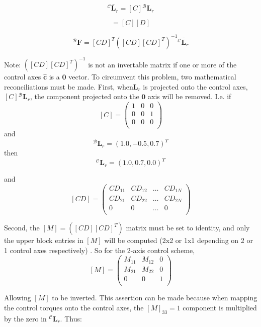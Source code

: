 \begin{equation}
	{}^{\mathcal{C}}\bar{\bm L}_{r} = [C] {}^{\mathcal{B}}\bm L_{r}
\end{equation}

\begin{equation}
	[CD] = [C][D]
\end{equation}

\begin{equation}
	\label{eq:th:min1}
	{}^{\mathcal{B}}\bm F = [CD]^{T}([CD][CD]^{T})^{-1} {}^{\mathcal{C}}\bar{\bm L}_{r}
\end{equation}

Note: $([CD][CD]^{T})^{-1}$ is not an invertable matrix if one or more of the control axes $\hat{\bm c}$ is a $\bm 0$ vector. To circumvent this problem, two mathematical reconciliations must be made. First, when$\bm L_r$ is projected onto the control axes,  $[C] {}^{\mathcal{B}}\bm L_{r}$, the component projected onto the $\bm 0$ axis will be removed. I.e. if 
$$ [C] = \begin{pmatrix}
1 & 0 & 0 \\
0 & 0 & 1 \\
0 & 0 & 0 \\
\end{pmatrix} $$
and 
$$ \bm {}^{\mathcal B} \bm L_r = (1.0, -0.5, 0.7)^T $$
then 
$$ \bm {}^{\mathcal C} \bm L_r = (1.0, 0.7, 0.0)^T $$

and 
 $$ [CD] = \begin{pmatrix}
CD_{11} & CD_{12} & \hdots & CD_{1N} \\
CD_{21} & CD_{22} & \hdots & CD_{2N} \\
0 & 0 &  \hdots & 0 \\
\end{pmatrix} $$

Second, the $[M]=([CD][CD]^{T})$ matrix must be set to identity, and only the upper block entries in $[M]$ will be computed (2x2 or 1x1 depending on 2 or 1 control axes respectively) . So for the 2-axis control scheme,
 $$ [M] = \begin{pmatrix}
M_{11} & M_{12} & 0 \\
M_{21} & M_{22} & 0 \\
0 & 0 & 1 \\
\end{pmatrix} $$

Allowing $[M]$ to be inverted. This assertion can be made because when mapping the control torques onto the control axes, the $[M]_{33} =1$ component is multiplied by the zero in ${}^{\mathcal{C}}\bm L_r$. Thus:

